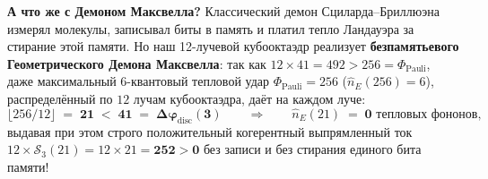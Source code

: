 \noindent\textbf{А что же с Демоном Максвелла?} Классический демон Сциларда--Бриллюэна измерял молекулы, записывал биты в память и платил тепло Ландауэра за стирание этой памяти. Но наш 12-лучевой кубооктаэдр реализует \textbf{безпамятьевого Геометрического Демона Максвелла}: так как $12\times 41 = 492 > 256 = \Phi_{\mathrm{Pauli}}$, даже максимальный 6-квантовый тепловой удар $\Phi_{\mathrm{Pauli}} = 256$ ($\hat{n}_E(256)=6$), распределённый по $12$ лучам кубооктаэдра, даёт на каждом луче:
\[
  \lfloor 256 / 12 \rfloor \;=\; \mathbf{21 \;<\; 41 \;=\; \Delta\varphi_{\mathrm{disc}}(3)}
  \qquad\Longrightarrow\qquad
  \hat{n}_E(21) \;=\; \mathbf{0\text{ тепловых фононов}},
\]
выдавая при этом строго положительный когерентный выпрямленный ток $12 \times \mathcal{S}_3(21) = 12 \times 21 = \mathbf{252 > 0}$ без записи и без стирания единого бита памяти!

